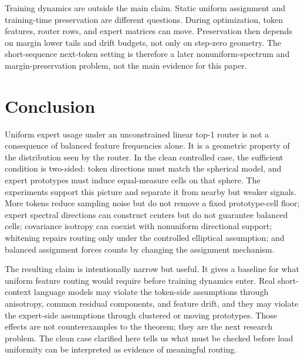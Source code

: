 \documentclass{article}
\begin{document}
Training dynamics are outside the main claim.  Static uniform assignment and
training-time preservation are different questions.  During optimization, token
features, router rows, and expert matrices can move.  Preservation then depends
on margin lower tails and drift budgets, not only on step-zero geometry.  The
short-sequence next-token setting is therefore a later nonuniform-spectrum and
margin-preservation problem, not the main evidence for this paper.

\section{Conclusion}

Uniform expert usage under an unconstrained linear top-1 router is not a
consequence of balanced feature frequencies alone.  It is a geometric property
of the distribution seen by the router.  In the clean controlled case, the
sufficient condition is two-sided: token directions must match the spherical
model, and expert prototypes must induce equal-measure cells on that sphere.
The experiments support this picture and separate it from nearby but weaker
signals.  More tokens reduce sampling noise but do not remove a fixed
prototype-cell floor; expert spectral directions can construct centers but do
not guarantee balanced cells; covariance isotropy can coexist with nonuniform
directional support; whitening repairs routing only under the controlled
elliptical assumption; and balanced assignment forces counts by changing the
assignment mechanism.

The resulting claim is intentionally narrow but useful.  It gives a baseline for
what uniform feature routing would require before training dynamics enter.  Real
short-context language models may violate the token-side assumptions through
anisotropy, common residual components, and feature drift, and they may violate
the expert-side assumptions through clustered or moving prototypes.  Those
effects are not counterexamples to the theorem; they are the next research
problem.  The clean case clarified here tells us what must be checked before
load uniformity can be interpreted as evidence of meaningful routing.



\end{document}

